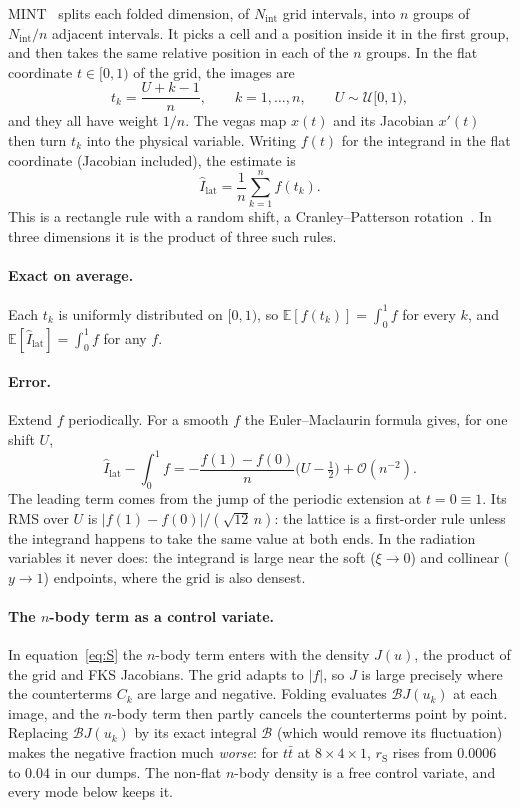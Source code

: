 \documentclass[11pt,a4paper]{article}
\newcommand{\rS}{r_{\mathrm S}}
\begin{document}
MINT~\cite{Nason:2007vt} splits each folded dimension, of $N_{\mathrm{int}}$ grid
intervals, into $n$ groups of $N_{\mathrm{int}}/n$ adjacent intervals. It picks a cell and a
position inside it in the first group, and then takes the same relative position in each of
the $n$ groups. In the flat coordinate $t\in[0,1)$ of the grid, the images are
\begin{equation}
  t_k = \frac{U+k-1}{n},\qquad k=1,\dots,n,\qquad U\sim\mathcal U[0,1),
  \label{eq:lattice}
\end{equation}
and they all have weight $1/n$. The vegas map $x(t)$ and its Jacobian $x'(t)$ then turn
$t_k$ into the physical variable. Writing $f(t)$ for the integrand in the flat coordinate
(Jacobian included), the estimate is
\begin{equation}
  \hat I_{\mathrm{lat}} = \frac1n\sum_{k=1}^n f(t_k).
\end{equation}
This is a rectangle rule with a random shift, a Cranley--Patterson rotation~\cite{Cranley:1976}. In three
dimensions it is the product of three such rules.

\paragraph{Exact on average.}
Each $t_k$ is uniformly distributed on $[0,1)$, so $\mathbb E[f(t_k)]=\int_0^1 f$ for
every $k$, and $\mathbb E[\hat I_{\mathrm{lat}}]=\int_0^1 f$ for any $f$.

\paragraph{Error.}
Extend $f$ periodically. For a smooth $f$ the Euler--Maclaurin formula gives, for one shift $U$,
\begin{equation}
  \hat I_{\mathrm{lat}}-\int_0^1 f = -\frac{f(1)-f(0)}{n}\Big(U-\tfrac12\Big)+\mathcal O(n^{-2}).
  \label{eq:EMlattice}
\end{equation}
The leading term comes from the jump of the periodic extension at $t=0\equiv1$. Its RMS over $U$ is
$|f(1)-f(0)|/(\sqrt{12}\,n)$: the lattice is a first-order rule unless the integrand happens
to take the same value at both ends. In the radiation variables it never does: the
integrand is large near the soft ($\xi\to0$) and collinear ($y\to1$) endpoints, where the
grid is also densest.

\paragraph{The $n$-body term as a control variate.}
In equation~\eqref{eq:S} the $n$-body term enters with the density $J(u)$, the product of the grid
and FKS Jacobians. The grid adapts to $|f|$, so $J$ is large precisely where the
counterterms $C_k$ are large and negative. Folding evaluates $\mathcal B J(u_k)$ at each image,
and the $n$-body term then partly cancels the counterterms point by point. Replacing
$\mathcal B J(u_k)$ by its exact integral $\mathcal B$ (which would remove its fluctuation)
makes the negative fraction much \emph{worse}: for $t\bar t$ at $8\times4\times1$, $\rS$
rises from $0.0006$ to $0.04$ in our dumps. The non-flat $n$-body density is a free control
variate, and every mode below keeps it.
\end{document}
